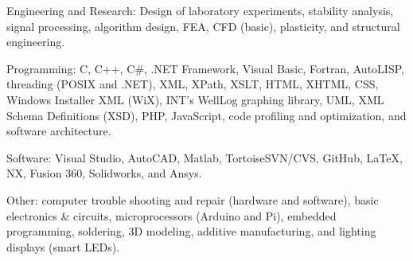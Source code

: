 \documentclass{leresume}
\begin{document}
    \begin{bulletedlist}
		
		\item Engineering and Research: Design of laboratory experiments,
                        stability analysis,
                        signal processing,
                        algorithm design,
                        FEA,
                        CFD (basic),
                        plasticity,
                        and structural engineering.
                        
		\item Programming: C,
                        C++,
                        C\#,
                        .NET Framework,
                        Visual Basic,
                        Fortran,
                        AutoLISP,
                        threading (POSIX and .NET),
                        XML,
                        XPath,
                        XSLT,
                        HTML,
                        XHTML,
                        CSS,
                        Windows Installer XML (WiX),
                        INT's WellLog graphing library,
                        UML,
                        XML Schema Definitions (XSD),
                        PHP,
                        JavaScript,
                        code profiling and optimization,
                        and software architecture.
                        
		\item Software: Visual Studio,
                        AutoCAD,
                        Matlab,
                        TortoiseSVN/CVS,
                        GitHub,
                        LaTeX,
                        NX,
                        Fusion 360,
                        Solidworks,
                        and Ansys.
                        
		\item Other: computer trouble shooting and repair (hardware and software),
                        basic electronics \& circuits,
                        microprocessors (Arduino and Pi),
                        embedded programming,
                        soldering,
                        3D modeling,
                        additive manufacturing,
                        and lighting displays (smart LEDs).
                        
	\end{bulletedlist}
	

    
\end{document}
